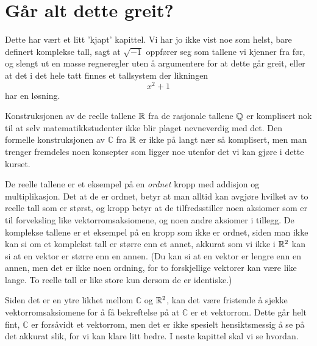 \section*{Går alt dette greit?}
Dette har vært et litt 'kjapt' kapittel. Vi har jo ikke vist noe som helst, bare definert komplekse tall, sagt at $\sqrt{-1}$ oppfører seg som tallene vi kjenner fra før, og slengt ut en masse regneregler uten å argumentere for at dette går greit, eller at det i det hele tatt finnes et tallsystem der likningen
\[
x^2+1
\]
har en løsning. 

Konstruksjonen av de reelle tallene $\mathbb{R}$ fra de rasjonale tallene $\mathbb{Q}$ er komplisert nok til at selv matematikkstudenter ikke blir plaget nevneverdig med det. Den formelle konstruksjonen av $\mathbb C$ fra $\mathbb{R}$ er ikke på langt nær så komplisert, men man trenger fremdeles noen konsepter som ligger noe utenfor det vi kan gjøre i dette kurset.

De reelle tallene er et eksempel på en \emph{ordnet} kropp med addisjon og multiplikasjon. Det at de er ordnet, betyr at man alltid kan avgjøre hvilket av to reelle tall som er størst, og kropp betyr at de tilfredsstiller noen aksiomer som er til forveksling like vektorromsaksiomene, og noen andre aksiomer i tillegg. De komplekse tallene er et eksempel på en kropp som ikke er ordnet, siden man ikke kan si om et komplekst tall er større enn et annet, akkurat som vi ikke i $\mathbb{R}^2$ kan si at en vektor er større enn en annen. (Du kan si at en vektor er lengre enn en annen, men det er ikke noen ordning, for to forskjellige vektorer kan være like lange. To reelle tall er like store kun dersom de er identiske.)

Siden det er en ytre likhet mellom $\mathbb C$ og $\mathbb{R}^2$, kan det være fristende å sjekke vektorromsaksiomene for å få bekreftelse på at $\mathbb C$ er et vektorrom. Dette går helt fint, $\mathbb C$ er forsåvidt et vektorrom, men det er ikke spesielt hensiktsmessig å se på det akkurat slik, for vi kan klare litt bedre. I neste kapittel skal vi se hvordan.

%
%
%
%
%
%
%
\kapittelslutt
